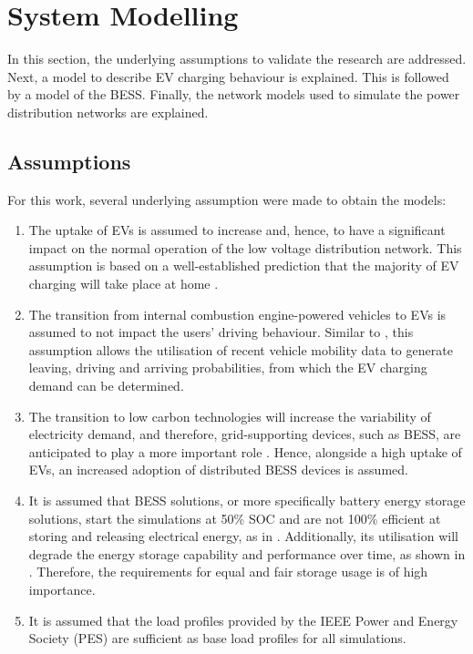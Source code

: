 \section{System Modelling}
\label{ch1:sec:system-modelling}

In this section, the underlying assumptions to validate the research are addressed. Next, a model to describe EV charging behaviour is explained. This is followed by a model of the BESS. Finally, the network models used to simulate the power distribution networks are explained.

\subsection{Assumptions}

For this work, several underlying assumption were made to obtain the models:
\begin{enumerate}
\item The uptake of EVs is assumed to increase and, hence, to have a significant impact on the normal operation of the low voltage distribution network. This assumption is based on a well-established prediction that the majority of EV charging will take place at home \cite{Munkhammar2015a}.
\item The transition from internal combustion engine-powered vehicles to EVs is assumed to not impact the users' driving behaviour. Similar to \cite{Dallinger2012}, this assumption allows the utilisation of recent vehicle mobility data \cite{MiD2008} to generate leaving, driving and arriving probabilities, from which the EV charging demand can be determined.
\item The transition to low carbon technologies will increase the variability of electricity demand, and therefore, grid-supporting devices, such as BESS, are anticipated to play a more important role \cite{FES2015}. Hence, alongside a high uptake of EVs, an increased adoption of distributed BESS devices is assumed.
\item It is assumed that BESS solutions, or more specifically battery energy storage solutions, start the simulations at 50\% SOC and are not 100\% efficient at storing and releasing electrical energy, as in \cite{Rowe2014a}. Additionally, its utilisation will degrade the energy storage capability and performance over time, as shown in \cite{Laresgoiti2015}. Therefore, the requirements for equal and fair storage usage is of high importance.
\item It is assumed that the load profiles provided by the IEEE Power and Energy Society (PES) are sufficient as base load profiles for all simulations.
\end{enumerate}

